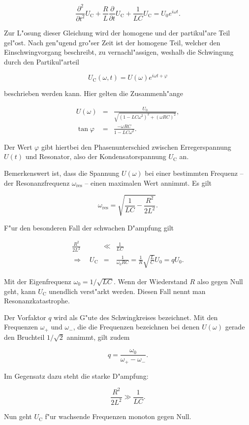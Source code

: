 		\begin{equation}
			\frac{\partial^2}{\partial t^2} U_\mathrm{C} + \frac{R}{L} \frac{\partial}{\partial t} U_\mathrm{C} + \frac{1}{LC} U_\mathrm{C} = U_0 e^{i \omega t}.
		\end{equation}

		Zur L"osung dieser Gleichung wird der homogene und der partikul"are Teil gel"ost.
		Nach gen"ugend gro"ser Zeit ist der homogene Teil, welcher den Einschwingvorgang beschreibt, zu vernachl"assigen, weshalb die Schwingung durch den Partikul"arteil

		\begin{equation}
			U_\mathrm{C} (\omega, t) = U(\omega)e^{i \omega t + \varphi}
		\end{equation}

		beschrieben werden kann.
		Hier gelten die Zusammenh"ange

		\begin{eqnarray}
			U(\omega) & = & \frac{U_0}{\sqrt{\left( 1 - LC \omega^2 \right)^2 + \left( \omega RC\right)^2}}, \\
			\tan{\varphi} & = & \frac{-\omega RC}{1 - LC\omega^2}.
		\end{eqnarray}

		Der Wert $\varphi$ gibt hiertbei den Phasenunterschied zwischen Erregerspannung $U(t)$ und Resonator, also der Kondensatorspannung $U_\mathrm{C}$ an.

		Bemerkenswert ist, dass die Spannung $U(\omega)$ bei einer bestimmten Frequenz -- der Resonanzfrequenz $\omega_\mathrm{res}$ -- einen maximalen Wert annimmt.
		Es gilt

		\begin{equation}
			\omega_\mathrm{res} = \sqrt{\frac{1}{LC}-\frac{R^2}{2L^2}}.
		\end{equation}

		F"ur den besonderen Fall der schwachen D"ampfung gilt

		\begin{eqnarray}
			\frac{R^2}{2L^2} & \ll & \frac{1}{LC} \\
			\Rightarrow \quad U_\mathrm{C} & = & \frac{1}{\omega_0 RC} = \frac{1}{R} \sqrt{\frac{L}{C}} U_0 = q U_0.
		\end{eqnarray}

		Mit der Eigenfrequenz $\omega_0 = 1/\sqrt{LC}$.
		Wenn der Wiederstand $R$ also gegen Null geht, kann $U_\mathrm{C}$ unendlich verst"arkt werden.
		Diesen Fall nennt man Resonanzkatastrophe.

		Der Vorfaktor $q$ wird als G"ute des Schwingkreises bezeichnet.
		Mit den Frequenzen $\omega_+$ und $\omega_-$, die die Frequenzen bezeichnen bei denen $U(\omega)$ gerade den Bruchteil $1/\sqrt{2}$ annimmt, gilt zudem

		\begin{equation}
			q = \frac{\omega_0}{\omega_+ - \omega_-}.
		\end{equation}

		Im Gegensatz dazu steht die starke D"ampfung:

		\begin{equation}
			\frac{R^2}{2L^2} \gg \frac{1}{LC}.
		\end{equation}

		Nun geht $U_\mathrm{C}$ f"ur wachsende Frequenzen monoton gegen Null.